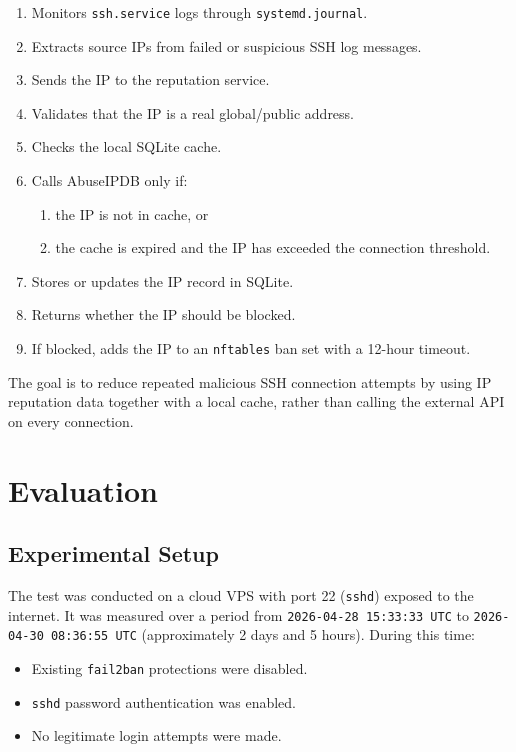 \documentclass[11pt, letterpaper]{article}
\begin{document}
\begin{enumerate}[leftmargin=2em, itemsep=2pt]
    \item Monitors \texttt{ssh.service} logs through \texttt{systemd.journal}.
    \item Extracts source IPs from failed or suspicious SSH log messages.
    \item Sends the IP to the reputation service.
    \item Validates that the IP is a real global/public address.
    \item Checks the local SQLite cache.
    \item Calls AbuseIPDB only if:
        \begin{enumerate}[label=\arabic{enumi}.\arabic*, leftmargin=1.5em, itemsep=1pt]
            \item the IP is not in cache, or
            \item the cache is expired and the IP has exceeded the connection threshold.
        \end{enumerate}
    \item Stores or updates the IP record in SQLite.
    \item Returns whether the IP should be blocked.
    \item If blocked, adds the IP to an \texttt{nftables} ban set with a 12-hour timeout.
\end{enumerate}

The goal is to reduce repeated malicious SSH connection attempts by using IP reputation data together with a local cache, rather than calling the external API on every connection.

\section{Evaluation}

\subsection{Experimental Setup}
The test was conducted on a cloud VPS with port 22 (\texttt{sshd}) exposed to the internet. It was measured over a period from \texttt{2026-04-28 15:33:33 UTC} to \texttt{2026-04-30 08:36:55 UTC} (approximately 2 days and 5 hours). During this time:
\begin{itemize}
    \item Existing \texttt{fail2ban} protections were disabled.
    \item \texttt{sshd} password authentication was enabled.
    \item No legitimate login attempts were made.
\end{itemize}
\end{document}

